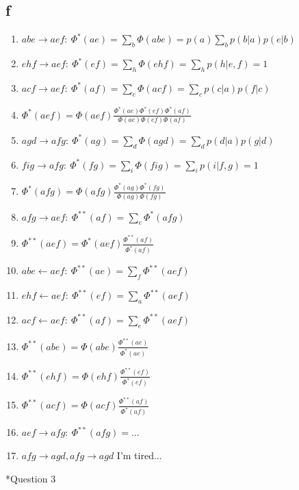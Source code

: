 \documentclass[12pt]{amsart}
\makeatletter
\renewcommand{\section}{\@startsection{section}{1}{0mm}
{-\baselineskip}{0.5\baselineskip}{\bf\leftline}}
\makeatother
\begin{document}
\subsection*{f}
\begin{enumerate}
\item $abe\rightarrow aef:~\Phi^*(ae)= \sum_b\Phi(abe) = p(a)\sum_bp(b|a)p(e|b)$
\item $ehf\rightarrow aef:~\Phi^*(ef)= \sum_h\Phi(ehf) = \sum_hp(h|e,f) = 1$
\item $acf\rightarrow aef:~\Phi^*(af)= \sum_c\Phi(acf) = \sum_cp(c|a)p(f|c)$
\item $\Phi^*(aef)=\Phi(aef)\frac{\Phi^*(ae)\Phi^*(ef)\Phi^*(af)}{\Phi(ae)\Phi(ef)\Phi(af)}$
\item $agd\rightarrow afg:~\Phi^*(ag)= \sum_d\Phi(agd)=\sum_dp(d|a)p(g|d)$
\item $fig\rightarrow afg:~\Phi^*(fg)= \sum_i\Phi(fig)=\sum_ip(i|f,g)=1$
\item $\Phi^*(afg)=\Phi(afg)\frac{\Phi^*(ag)\Phi^*(fg)}{\Phi(ag)\Phi(fg)}$
\item $afg\rightarrow aef:~\Phi^{**}(af)= \sum_e\Phi^*(afg)$
\item $\Phi^{**}(aef)=\Phi^*(aef)\frac{\Phi^{**}(af)}{\Phi^*(af)}$
\item $abe\leftarrow aef:~\Phi^{**}(ae)= \sum_f\Phi^{**}(aef)$
\item $ehf\leftarrow aef:~\Phi^{**}(ef)= \sum_a\Phi^{**}(aef)$
\item $acf\leftarrow aef:~\Phi^{**}(af)= \sum_e\Phi^{**}(aef)$
\item $\Phi^{**}(abe)=\Phi(abe)\frac{\Phi^{**}(ae)}{\Phi^{*}(ae)}$
\item $\Phi^{**}(ehf)=\Phi(ehf)\frac{\Phi^{**}(ef)}{\Phi^{*}(ef)}$
\item $\Phi^{**}(acf)=\Phi(acf)\frac{\Phi^{**}(af)}{\Phi^{*}(af)}$
\item $aef\rightarrow afg:~\Phi^{**}(afg)=\ldots$
\item $afg\rightarrow agd,afg\rightarrow agd$ I'm tired...

\end{enumerate}

\section*{Question 3}
\end{document}
